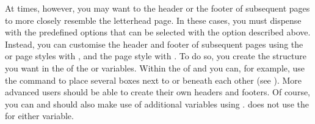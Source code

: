 \begin{Declaration}
\end{Declaration}
At times, however, you may want to the header or the footer of subsequent pages
to more closely resemble the letterhead page. In these cases, you must dispense
with the predefined options that can be selected with the 
 option described above. 
Instead, you can customise the header and footer of subsequent pages using the
%
 or
 page styles with ,
and the %
 page style
with .  To do so, you create the
structure you want in the  of
the  or
 variables. Within the  of
 and  you can, for example, use the 
command to place several boxes next to or beneath each other (see \cite{latex:usrguide}). More advanced users should
be able to create their own headers and footers. Of course, you can
and should also make use of additional variables using
. \KOMAScript{} does not use the
 for either variable.
%
%
\EndIndexGroup
\EndIndexGroup
%
\EndIndexGroup






